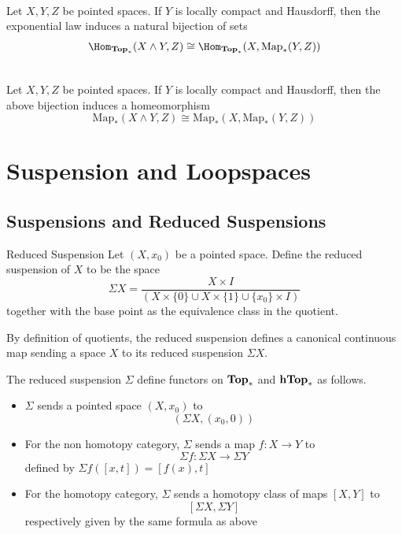 \documentclass[a4paper]{article}
\begin{document}
\begin{prp}{}{}\\
Let $X,Y,Z$ be pointed spaces. If $Y$ is locally compact and Hausdorff, then the exponential law induces a natural bijection of sets $$\Hom_{\bold{Top}_\ast}(X\wedge Y,Z)\cong\Hom_{\bold{Top}_\ast}(X,\text{Map}_\ast(Y,Z))$$
\end{prp}

\begin{prp}{}{}\\
Let $X,Y,Z$ be pointed spaces. If $Y$ is locally compact and Hausdorff, then the above bijection induces a homeomorphism $$\text{Map}_\ast(X\wedge Y,Z)\cong\text{Map}_\ast(X,\text{Map}_\ast(Y,Z))$$
\end{prp}

\pagebreak
\section{Suspension and Loopspaces}
\subsection{Suspensions and Reduced Suspensions}
\begin{defn}{Reduced Suspension}{} Let $(X,x_0)$ be a pointed space. Define the reduced suspension of $X$ to be the space $$\Sigma X=\frac{X\times I}{(X\times\{0\}\cup X\times\{1\}\cup\{x_0\}\times I)}$$ together with the base point as the equivalence class in the quotient. 
\end{defn}

By definition of quotients, the reduced suspension defines a canonical continuous map sending a space $X$ to its reduced suspension $\Sigma X$. 

\begin{prp}{}{} The reduced suspension $\Sigma$ define functors on $\bold{Top}_\ast$ and $\bold{hTop}_\ast$ as follows. 
\begin{itemize}
\item $\Sigma$ sends a pointed space $(X,x_0)$ to $$(\Sigma X,(x_0,0))$$
\item For the non homotopy category, $\Sigma$ sends a map $f:X\to Y$ to $$\Sigma f:\Sigma X\to\Sigma Y$$ defined by $\Sigma f([x,t])=[f(x),t]$
\item For the homotopy category, $\Sigma$ sends a homotopy class of maps $[X,Y]$ to $$[\Sigma X,\Sigma Y]$$ respectively given by the same formula as above
\end{itemize}
\end{prp}
\end{document}
